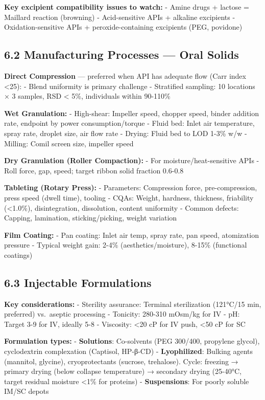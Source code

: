 \documentclass[
  11pt,
  a4paper,
]{report}
\begin{document}
\textbf{Key excipient compatibility issues to watch:} - Amine drugs +
lactose = Maillard reaction (browning) - Acid-sensitive APIs + alkaline
excipients - Oxidation-sensitive APIs + peroxide-containing excipients
(PEG, povidone)

\hypertarget{manufacturing-processes-oral-solids}{%
\subsection{6.2 Manufacturing Processes --- Oral
Solids}\label{manufacturing-processes-oral-solids}}

\textbf{Direct Compression} --- preferred when API has adequate flow
(Carr index \textless25): - Blend uniformity is primary challenge -
Stratified sampling: 10 locations × 3 samples, RSD \textless{} 5\%,
individuals within 90-110\%

\textbf{Wet Granulation:} - High-shear: Impeller speed, chopper speed,
binder addition rate, endpoint by power consumption/torque - Fluid bed:
Inlet air temperature, spray rate, droplet size, air flow rate - Drying:
Fluid bed to LOD 1-3\% w/w - Milling: Comil screen size, impeller speed

\textbf{Dry Granulation (Roller Compaction):} - For
moisture/heat-sensitive APIs - Roll force, gap, speed; target ribbon
solid fraction 0.6-0.8

\textbf{Tableting (Rotary Press):} - Parameters: Compression force,
pre-compression, press speed (dwell time), tooling - CQAs: Weight,
hardness, thickness, friability (\textless1.0\%), disintegration,
dissolution, content uniformity - Common defects: Capping, lamination,
sticking/picking, weight variation

\textbf{Film Coating:} - Pan coating: Inlet air temp, spray rate, pan
speed, atomization pressure - Typical weight gain: 2-4\%
(aesthetics/moisture), 8-15\% (functional coatings)

\hypertarget{injectable-formulations}{%
\subsection{6.3 Injectable Formulations}\label{injectable-formulations}}

\textbf{Key considerations:} - Sterility assurance: Terminal
sterilization (121°C/15 min, preferred) vs.~aseptic processing -
Tonicity: 280-310 mOsm/kg for IV - pH: Target 3-9 for IV, ideally 5-8 -
Viscosity: \textless20 cP for IV push, \textless50 cP for SC

\textbf{Formulation types:} - \textbf{Solutions}: Co-solvents (PEG
300/400, propylene glycol), cyclodextrin complexation (Captisol,
HP-β-CD) - \textbf{Lyophilized}: Bulking agents (mannitol, glycine),
cryoprotectants (sucrose, trehalose). Cycle: freezing → primary drying
(below collapse temperature) → secondary drying (25-40°C, target
residual moisture \textless1\% for proteins) - \textbf{Suspensions}: For
poorly soluble IM/SC depots
\end{document}
